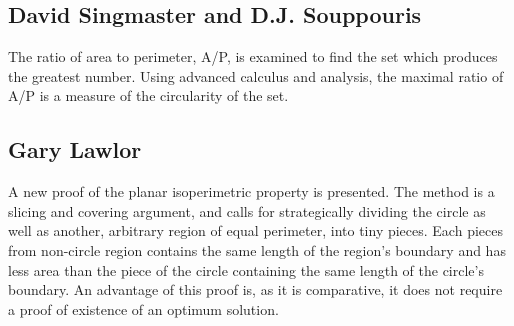 \documentclass[a4paper]{book}
\begin{document}
\subsection{David Singmaster and D.J. Souppouris}
The ratio of area to perimeter, A/P, is examined to find the set which produces the greatest number. Using advanced calculus and analysis, the maximal ratio of A/P is a measure of the circularity of the set.

\subsection{Gary Lawlor}
A new proof of the planar isoperimetric property is presented. The method is a slicing and covering argument, and calls for strategically dividing the circle as well as another, arbitrary region of equal perimeter, into tiny pieces. Each pieces from non-circle region contains the same length of the region’s boundary and has less area than the piece of the circle containing the same length of the circle’s boundary. An advantage of this proof is, as it is comparative, it does not require a proof of existence of an optimum solution.
\end{document}
